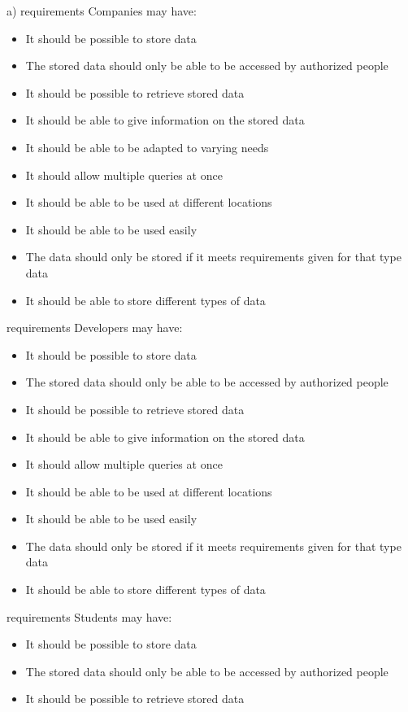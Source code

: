 \begin{elenco}
\item 
a) 
requirements Companies may have:
\begin{itemize}
    \item It should be possible to store data
    \item The stored data should only be able to be accessed by authorized people
    \item It should be possible to retrieve stored data
    \item It should be able to give information on the stored data
    \item It should be able to be adapted to varying needs
    \item It should allow multiple queries at once
    \item It should be able to be used at different locations
    \item It should be able to be used easily
    \item The data should only be stored if it meets requirements given for that type data
    \item It should be able to store different types of data
\end{itemize} 
requirements Developers may have:
\begin{itemize}
    \item It should be possible to store data
    \item The stored data should only be able to be accessed by authorized people
    \item It should be possible to retrieve stored data
    \item It should be able to give information on the stored data
    \item It should allow multiple queries at once
    \item It should be able to be used at different locations
    \item It should be able to be used easily
    \item The data should only be stored if it meets requirements given for that type data
    \item It should be able to store different types of data
\end{itemize}
requirements Students may have:
\begin{itemize}
    \item It should be possible to store data
    \item The stored data should only be able to be accessed by authorized people
    \item It should be possible to retrieve stored data

\end{itemize}
\end{elenco}
